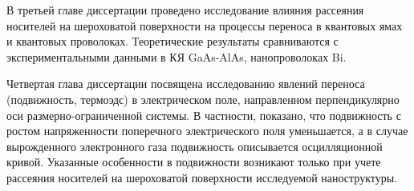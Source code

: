 В третьей главе диссертации проведено исследование влияния рассеяния носителей на шероховатой поверхности на процессы переноса в квантовых ямах и квантовых проволоках. Теоретические результаты сравниваются с экспериментальными данными в КЯ GaAs-AlAs, нанопроволоках Bi.

Четвертая глава диссертации посвящена исследованию явлений переноса (подвижность, термоэдс) в электрическом поле, направленном перпендикулярно оси размерно-ограниченной системы. В частности, показано, что подвижность с ростом напряженности поперечного электрического поля уменьшается, а в случае вырожденного электронного газа подвижность описывается осцилляционной кривой. Указанные особенности в подвижности возникают только при учете рассеяния носителей на шероховатой поверхности исследуемой наноструктуры.
\fi

%
%
%
%
%
%
%
%


